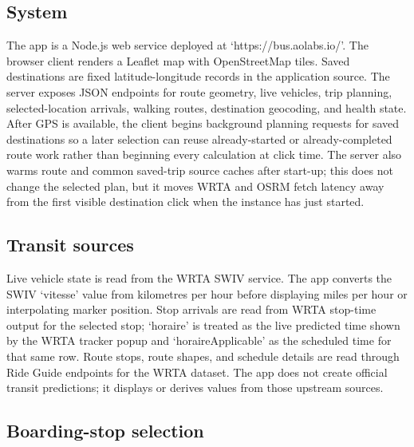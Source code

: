 \documentclass[12pt,letterpaper]{article}
\begin{document}
\subsection{System}

The app is a Node.js web service deployed at `https://bus.aolabs.io/'. The browser client renders a Leaflet map with OpenStreetMap tiles. Saved destinations are fixed latitude-longitude records in the application source. The server exposes JSON endpoints for route geometry, live vehicles, trip planning, selected-location arrivals, walking routes, destination geocoding, and health state. After GPS is available, the client begins background planning requests for saved destinations so a later selection can reuse already-started or already-completed route work rather than beginning every calculation at click time. The server also warms route and common saved-trip source caches after start-up; this does not change the selected plan, but it moves WRTA and OSRM fetch latency away from the first visible destination click when the instance has just started.

\subsection{Transit sources}

Live vehicle state is read from the WRTA SWIV service. The app converts the SWIV `vitesse' value from kilometres per hour before displaying miles per hour or interpolating marker position. Stop arrivals are read from WRTA stop-time output for the selected stop; `horaire' is treated as the live predicted time shown by the WRTA tracker popup and `horaireApplicable' as the scheduled time for that same row. Route stops, route shapes, and schedule details are read through Ride Guide endpoints for the WRTA dataset. The app does not create official transit predictions; it displays or derives values from those upstream sources.

\subsection{Boarding-stop selection}
\end{document}
